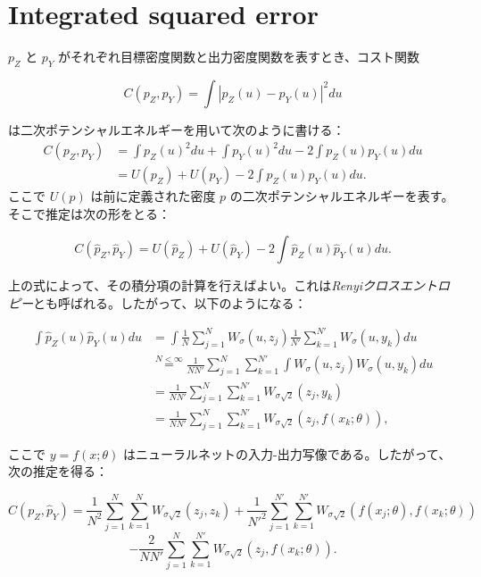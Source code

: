 \documentclass[dvipdfmx,a4paper]{jsarticle}%
\begin{document}
\section{\textbf{Integrated squared error}}
\begin{dfn}\label{def:ise}
   $p_Z$ と $p_Y$ がそれぞれ目標密度関数と出力密度関数を表すとき、コスト関数

$$C(p_Z, p_Y) = \int |p_Z(u) - p_Y(u)|^2 du$$

は二次ポテンシャルエネルギーを用いて次のように書ける：
\begin{align*}
C(p_Z, p_Y) &= \int p_Z(u)^2 du + \int p_Y(u)^2 du - 2 \int p_Z(u)p_Y(u) du\\
&= U(p_Z) + U(p_Y) - 2 \int p_Z(u)p_Y(u) du.
\end{align*}
ここで $U(p)$ は前に定義された密度 $p$ の二次ポテンシャルエネルギーを表す。そこで推定は次の形をとる：

$$C(\hat{p}_Z, \hat{p}_Y) = U(\hat{p}_Z) + U(\hat{p}_Y) - 2 \int \hat{p}_Z(u)\hat{p}_Y(u) du.$$

\noindent
上の式によって、その積分項の計算を行えばよい。これは\textit{Renyiクロスエントロピー}とも呼ばれる。したがって、以下のようになる：

\begin{align*}
\int \hat{p}_Z(u)\hat{p}_Y(u) du &= \int \frac{1}{N} \sum_{j=1}^N W_\sigma(u, z_j) \frac{1}{N'} \sum_{k=1}^{N'} W_\sigma(u, y_k) du \\
&\stackrel{N<\infty}{=} \frac{1}{NN'} \sum_{j=1}^N \sum_{k=1}^{N'} \int W_\sigma(u, z_j)W_\sigma(u, y_k) du \\
&= \frac{1}{NN'} \sum_{j=1}^N \sum_{k=1}^{N'} W_{\sigma\sqrt{2}}(z_j, y_k) \\
&= \frac{1}{NN'} \sum_{j=1}^N \sum_{k=1}^{N'} W_{\sigma\sqrt{2}}(z_j, f(x_k; \theta)),
\end{align*}

ここで $y = f(x; \theta)$ はニューラルネットの入力-出力写像である。したがって、次の推定を得る：

$$C(p_Z, \hat{p}_Y) = \frac{1}{N^2} \sum_{j=1}^N \sum_{k=1}^N W_{\sigma\sqrt{2}}(z_j, z_k) + \frac{1}{N'^2} \sum_{j=1}^{N'} \sum_{k=1}^{N'} W_{\sigma\sqrt{2}}(f(x_j; \theta), f(x_k; \theta))$$
$$- \frac{2}{NN'} \sum_{j=1}^N \sum_{k=1}^{N'} W_{\sigma\sqrt{2}}(z_j, f(x_k; \theta)).$$
\end{dfn}
\end{document}

